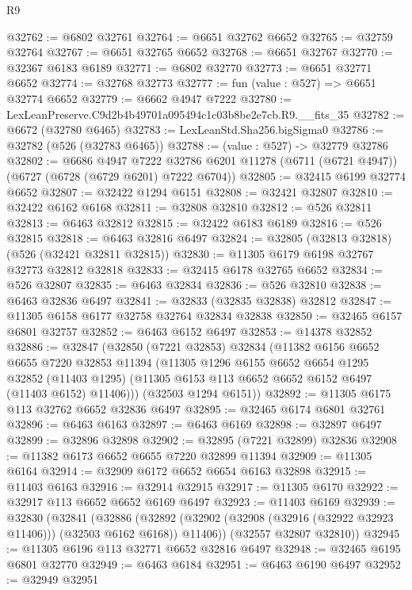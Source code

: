 \begin{lexlean}{R9}
\begin{coremodule}
@32762 := @6802 @32761
@32764 := @6651 @32762 @6652
@32765 := @32759 @32764
@32767 := @6651 @32765 @6652
@32768 := @6651 @32767
@32770 := @32367 @6183 @6189
@32771 := @6802 @32770
@32773 := @6651 @32771 @6652
@32774 := @32768 @32773
@32777 := fun (value : @527) => @6651 @32774 @6652
@32779 := @6662 @4947 @7222
@32780 := LexLeanPreserve.C9d2b4b49701a095494c1c03b8be2e7cb.R9.__fits_35
@32782 := @6672 (@32780 @6465)
@32783 := LexLeanStd.Sha256.bigSigma0
@32786 := @32782 (@526 (@32783 @6465))
@32788 := (value : @527) -> @32779 @32786
@32802 := @6686
    @4947
    @7222
    @32786
    @6201
    @11278
    (@6711 (@6721 @4947))
    (@6727 (@6728 (@6729 @6201) @7222 @6704))
@32805 := @32415 @6199 @32774 @6652
@32807 := @32422 @1294 @6151
@32808 := @32421 @32807
@32810 := @32422 @6162 @6168
@32811 := @32808 @32810
@32812 := @526 @32811
@32813 := @6463 @32812
@32815 := @32422 @6183 @6189
@32816 := @526 @32815
@32818 := @6463 @32816 @6497
@32824 := @32805 (@32813 @32818) (@526 (@32421 @32811 @32815))
@32830 := @11305 @6179 @6198 @32767 @32773 @32812 @32818
@32833 := @32415 @6178 @32765 @6652
@32834 := @526 @32807
@32835 := @6463 @32834
@32836 := @526 @32810
@32838 := @6463 @32836 @6497
@32841 := @32833 (@32835 @32838) @32812
@32847 := @11305 @6158 @6177 @32758 @32764 @32834 @32838
@32850 := @32465 @6157 @6801 @32757
@32852 := @6463 @6152 @6497
@32853 := @14378 @32852
@32886 := @32847
    (@32850
      (@7221 @32853)
      @32834
      (@11382
        @6156
        @6652
        @6655
        @7220
        @32853
        @11394
        (@11305
          @1296
          @6155
          @6652
          @6654
          @1295
          @32852
          (@11403 @1295)
          (@11305 @6153 @113 @6652 @6652 @6152 @6497 (@11403 @6152) @11406)))
      (@32503 @1294 @6151))
@32892 := @11305 @6175 @113 @32762 @6652 @32836 @6497
@32895 := @32465 @6174 @6801 @32761
@32896 := @6463 @6163
@32897 := @6463 @6169
@32898 := @32897 @6497
@32899 := @32896 @32898
@32902 := @32895 (@7221 @32899) @32836
@32908 := @11382 @6173 @6652 @6655 @7220 @32899 @11394
@32909 := @11305 @6164
@32914 := @32909 @6172 @6652 @6654 @6163 @32898
@32915 := @11403 @6163
@32916 := @32914 @32915
@32917 := @11305 @6170
@32922 := @32917 @113 @6652 @6652 @6169 @6497
@32923 := @11403 @6169
@32939 := @32830
    (@32841
      (@32886
        (@32892 (@32902 (@32908 (@32916 (@32922 @32923 @11406))) (@32503 @6162 @6168)) @11406))
      (@32557 @32807 @32810))
@32945 := @11305 @6196 @113 @32771 @6652 @32816 @6497
@32948 := @32465 @6195 @6801 @32770
@32949 := @6463 @6184
@32951 := @6463 @6190 @6497
@32952 := @32949 @32951

\end{coremodule}
\end{lexlean}
